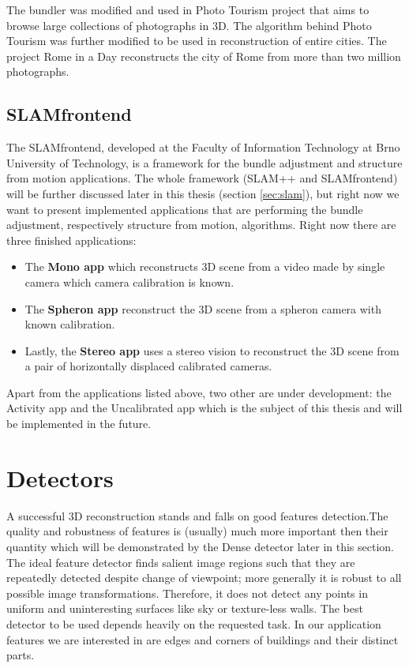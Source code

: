 The bundler was modified and used in Photo Tourism \cite{article:photo_tourism} \cite{article:photo_tourism2} project that aims to browse large collections of photographs in 3D. The algorithm behind Photo Tourism was further modified to be used in reconstruction of entire cities. The project Rome in a Day  \cite{article:rome_in_a_day} \cite{article:reconstructing_rome} \cite{article:rome_in_a_day2} reconstructs the city of Rome from more than two million photographs.

\subsection*{SLAM\textunderscore frontend}
The SLAM\textunderscore frontend, developed at the Faculty of Information Technology at Brno University of Technology, is a framework for the bundle adjustment and structure from motion applications. The whole framework (SLAM++ and SLAM\textunderscore frontend) will be further discussed later in this thesis (section \ref{sec:slam}), but right now we want to present implemented applications that are performing the bundle adjustment, respectively structure from motion, algorithms. Right now there are three finished applications:

\begin{itemize}
	\item The \textbf{Mono app} which reconstructs 3D scene from a video made by single camera which camera calibration is known.
	
	\item The \textbf{Spheron app} reconstruct the 3D scene from a spheron camera with known calibration.
	
	\item Lastly, the \textbf{Stereo app} uses a stereo vision to reconstruct the 3D scene from a pair of horizontally displaced calibrated cameras.
\end{itemize}

Apart from the applications listed above, two other are under development: the Activity app and the Uncalibrated app which is the subject of this thesis and will be implemented in the future.

\section{Detectors}
\label{sec:detectors}
A successful 3D reconstruction stands and falls on good features detection.The quality and robustness of features is (usually) much more important then their quantity which will be demonstrated by the Dense detector later in this section. The ideal feature detector finds salient image regions such that they are repeatedly detected despite change of viewpoint; more generally it is robust to all possible image transformations. Therefore, it does not detect any points in uniform and uninteresting surfaces like sky or texture-less walls. The best detector to be used depends heavily on the requested task. In our application features we are interested in are edges and corners of buildings and their distinct parts.

